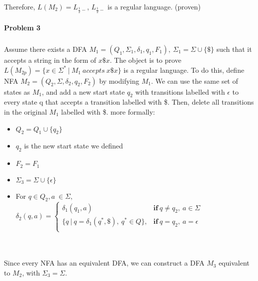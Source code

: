 \documentclass[12pt]{article}
\theoremstyle{definition}
\numberwithin{equation}{section}
\begin{document}
Therefore, $L(M_2) = L_{\frac{1}{2}-}$, $L_{\frac{1}{2}-}$ is a regular language. (proven)

\newpage
\paragraph{Problem 3}
\subparagraph{} Assume there exists a DFA $M_1 = (Q_1, \Sigma_1, \delta_1, q_1, F_1),\ \Sigma_1 = \Sigma\cup\{\$\}$ such that it accepts a string in the form of $x\$x$. The object is to prove $L(M_{2p}) = \{x \in \Sigma^*\ |\ M_1\ accepts\ x\$x\}$ is a regular language. To do this, define NFA $M_2 = (Q_2, \Sigma, \delta_2, q_2, F_2)$ by modifying $M_1$. We can use the same set of states as $M_1$, and add a new start state $q_2$ with transitions labelled with $\epsilon$ to every state q that accepts a transition labelled with \$. Then, delete all transitions in the original $M_1$ labelled with \$. more formally: \\
\begin{itemize}
	\item $Q_2 = Q_1 \cup \{q_2\}$\\
	\item $q_2$ is the new start state we defined
	\item $F_2 = F_1$ \\
	\item $\Sigma_3 = \Sigma \cup \{\epsilon\}$ \\
	\item For $q \in Q_2, a\ \in \Sigma,$ \\
	$\delta_2(q, a)=
    \begin{cases}
               \delta_1(q_1, a) &\textbf{if}\ q \neq q_2,\ a \in \Sigma \\
               \{q\ |\ q = \delta_1(q^*, \$),\ q^* \in Q\},  &\textbf{if}\ q = q_2,\ a = \epsilon\\
    \end{cases}$\\~\\~\\
\end{itemize}    

Since every NFA has an equivalent DFA, we can construct a DFA $M_3$ equivalent to $M_2$, with $\Sigma_3 = \Sigma$. \\~\\
\end{document}
